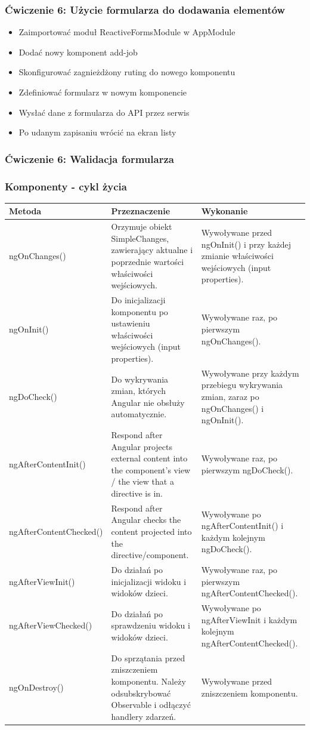 \documentclass{beamer}
\begin{document}
\begin{frame}
    \frametitle{Ćwiczenie 6: Użycie formularza do dodawania elementów}
    \begin{itemize}
        \item Zaimportować moduł ReactiveFormsModule w AppModule
        \item Dodać nowy komponent add-job
        \item Skonfigurować zagnieżdżony ruting do nowego komponentu
        \item Zdefiniować formularz w nowym komponencie
        \item Wysłać dane z formularza do API przez serwis
        \item Po udanym zapisaniu wrócić na ekran listy
    \end{itemize}
\end{frame}

\begin{frame}
    \frametitle{Ćwiczenie 6: Walidacja formularza}
    \begin{itemize}
    \end{itemize}
\end{frame}

\begin{frame}
    \frametitle{Komponenty - cykl życia}
\tiny
\begin{tabularx}{\textwidth}{l | X | X}
Metoda & Przeznaczenie & Wykonanie \\
\hline \hline
ngOnChanges() & Orzymuje obiekt SimpleChanges, zawierający aktualne i poprzednie wartości właściwości wejściowych. & Wywoływane przed ngOnInit() i przy każdej zmianie właściwości wejściowych (input properties).\\
ngOnInit() & Do inicjalizacji komponentu po ustawieniu właściwości wejściowych (input properties). & Wywoływane raz, po pierwszym ngOnChanges().\\
ngDoCheck() & Do wykrywania zmian, których Angular nie obsłuży automatycznie. & Wywoływane przy każdym przebiegu wykrywania zmian, zaraz po ngOnChanges() i ngOnInit().\\
ngAfterContentInit() & Respond after Angular projects external content into the component's view / the view that a directive is in. & Wywoływane raz, po pierwszym ngDoCheck().\\
ngAfterContentChecked()	& Respond after Angular checks the content projected into the directive/component. & Wywoływane po ngAfterContentInit() i każdym kolejnym ngDoCheck().\\
ngAfterViewInit() & Do działań po inicjalizacji widoku i widoków dzieci. & Wywoływane raz, po pierwszym ngAfterContentChecked().\\
ngAfterViewChecked() & Do działań po sprawdzeniu widoku i widoków dzieci. & Wywoływane po ngAfterViewInit i każdym kolejnym ngAfterContentChecked().\\
ngOnDestroy() & Do sprzątania przed zniszczeniem komponentu. Należy odsubskrybować Observable i odłączyć handlery zdarzeń. & Wywoływane przed zniszczeniem komponentu.\\
\end{tabularx}
\end{frame}
\end{document}

